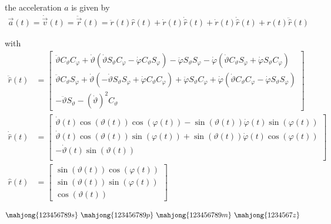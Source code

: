 \documentclass[11pt,a4paper]{article}
\begin{document}
\begin{enumerate}
the acceleration $a$ is given by
\begin{align}
\vec{a}(t)=\dot{\vec{v}}(t)=\ddot{\vec{r}}(t)=\ddot{r}(t)\hat{r}(t)+\dot{r}(t)\dot{\hat{r}}(t)+\dot{r}(t)\dot{\hat{r}}(t)+r(t)\ddot{\hat{r}}(t)
\end{align}

with
\begin{align*}
\ddot{\hat{r}}(t)
&=
\begin{bmatrix}
\ddot{\vartheta}C_\vartheta C_\varphi+\dot{\vartheta}(\dot{\vartheta}S_\vartheta C_\varphi-\dot{\varphi}C_\vartheta S_\varphi)
-
\ddot{\varphi}S_\vartheta S_\varphi-\dot{\varphi}(\dot{\vartheta}C_\vartheta S_\varphi+\dot{\varphi}S_\vartheta C_\varphi)
\\
\ddot{\vartheta}C_\vartheta S_\varphi+\dot{\vartheta}(-\dot{\vartheta}S_\vartheta S_\varphi+\dot{\varphi}C_\vartheta C_\varphi)
+
\ddot{\varphi}S_\vartheta C_\varphi+\dot{\varphi}(\dot{\vartheta}C_\vartheta C_\varphi-\dot{\varphi}S_\vartheta S_\varphi)
\\
-\ddot{\vartheta}S_\vartheta-(\dot{\vartheta})^2C_\vartheta
\end{bmatrix} \\
\dot{\hat{r}}(t)
&=
\begin{bmatrix}
\dot{\vartheta}(t)\cos(\vartheta(t))\cos(\varphi(t))-\sin(\vartheta(t))\dot{\varphi}(t)\sin(\varphi(t)) \\
\dot{\vartheta}(t)\cos(\vartheta(t))\sin(\varphi(t))+\sin(\vartheta(t))\dot{\varphi}(t)\cos(\varphi(t)) \\
-\dot{\vartheta}(t)\sin(\vartheta(t)) \\
\end{bmatrix} \\
\hat{r}(t)
&=
\begin{bmatrix}
\sin(\vartheta(t))\cos(\varphi(t)) \\
\sin(\vartheta(t))\sin(\varphi(t)) \\
\cos(\vartheta(t))
\end{bmatrix}
\end{align*}

\newpage



\begin{align*}
\mahjong{123456789s}\ 
\mahjong{123456789p}\ 
\mahjong{123456789m}\ 
\mahjong{1234567z}
\end{align*}

\end{enumerate}
\end{document}
